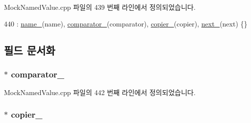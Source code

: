Mock\+Named\+Value.\+cpp 파일의 439 번째 라인에서 정의되었습니다.


\begin{DoxyCode}
440         : \hyperlink{struct_mock_named_value_comparators_and_copiers_repository_node_aac73c86e1e892f392d1fc423e25f51a8}{name\_}(name), \hyperlink{struct_mock_named_value_comparators_and_copiers_repository_node_ab6a2a3a4434b05754363c3c0137ffeb1}{comparator\_}(comparator), \hyperlink{struct_mock_named_value_comparators_and_copiers_repository_node_a054cf03c0e14abbd5f9f4c9604b5bfbe}{copier\_}(copier), 
      \hyperlink{struct_mock_named_value_comparators_and_copiers_repository_node_a2764dc799ce6105dd7b5a74a0aae8f6e}{next\_}(next) \{\}
\end{DoxyCode}


\subsection{필드 문서화}
\subsubsection[{\texorpdfstring{comparator\+\_\+}{comparator_}}]{$\ast$ comparator\+\_\+}\hypertarget{struct_mock_named_value_comparators_and_copiers_repository_node_ab6a2a3a4434b05754363c3c0137ffeb1}{}\label{struct_mock_named_value_comparators_and_copiers_repository_node_ab6a2a3a4434b05754363c3c0137ffeb1}


Mock\+Named\+Value.\+cpp 파일의 442 번째 라인에서 정의되었습니다.

\subsubsection[{\texorpdfstring{copier\+\_\+}{copier_}}]{$\ast$ copier\+\_\+}\hypertarget{struct_mock_named_value_comparators_and_copiers_repository_node_a054cf03c0e14abbd5f9f4c9604b5bfbe}{}\label{struct_mock_named_value_comparators_and_copiers_repository_node_a054cf03c0e14abbd5f9f4c9604b5bfbe}


